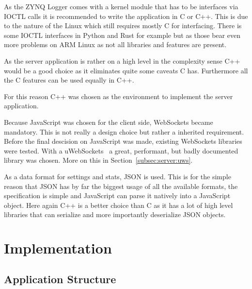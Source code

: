 As the ZYNQ Logger comes with a kernel module that has to be interfaces via IOCTL calls it is recommended to write the application in C or C++. This is due to the nature of the Linux which still requires mostly C for interfacing. There is some IOCTL interfaces in Python and Rust for example but as those bear even more problems on ARM Linux as not all libraries and features are present.

As the server application is rather on a high level in the complexity sense C++ would be a good choice as it eliminates quite some caveats C has. Furthermore all the C features can be used equally in C++.

For this reason C++ was chosen as the environment to implement the server application.

Because JavaScript was chosen for the client side, WebSockets became mandatory. This is not really a design choice but rather a inherited requirement. Before the final descision on JavaScript was made, existing WebSockets libraries were tested. With a uWebSockets~\cite{uws:github} a great, performant, but badly documented library was chosen. More on this in Section~\ref{subsec:server:uws}.

As a data format for settings and stats, JSON is used. This is for the simple reason that JSON has by far the biggest usage of all the available formats, the specification is simple and JavaScript can parse it natively into a JavaScript object.
Here again C++ is a better choice than C as it has a lot of high level libraries that can serialize and more importantly deserialize JSON objects.

%
%

\section{Implementation}
\label{sec:server:implementation}

%
%

\subsection{Application Structure}
\label{subsec}

